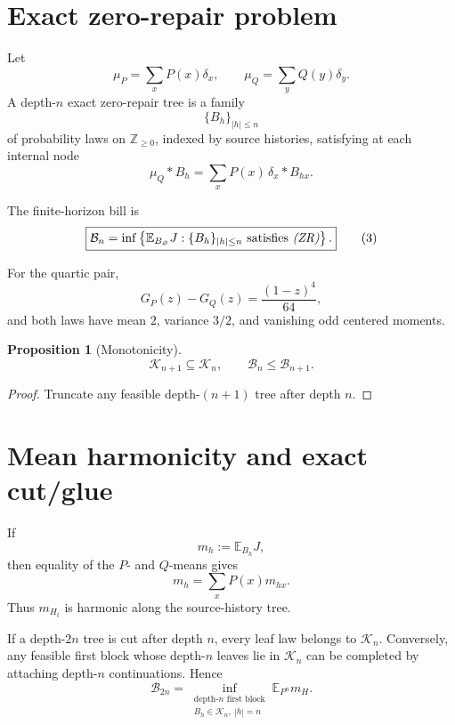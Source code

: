 \documentclass[11pt,a4paper]{article}
\newcommand{\Bcal}{\mathcal B}
\newcommand{\Kcal}{\mathcal K}
\newcommand{\E}{\mathbb E}
\newcommand{\Z}{\mathbb Z}
\newtheorem{proposition}[theorem]{Proposition}
\begin{document}
\section{Exact zero-repair problem}

Let
\[
\mu_P=\sum_xP(x)\delta_x,
\qquad
\mu_Q=\sum_yQ(y)\delta_y.
\]
A depth-\(n\) exact zero-repair tree is a family
\[
\{B_h\}_{|h|\le n}
\]
of probability laws on \(\Z_{\ge0}\), indexed by source histories, satisfying
at each internal node
\begin{equation}
\boxed{
\mu_Q*B_h
=
\sum_xP(x)\,\delta_x*B_{hx}.
}
\tag{ZR}
\end{equation}

The finite-horizon bill is
\[
\boxed{
\Bcal_n
=
\inf\left\{
\E_{B_\varnothing}J:
\{B_h\}_{|h|\le n}\text{ satisfies \emph{(ZR)}}
\right\}.
}
\tag{3}
\]

For the quartic pair,
\[
G_P(z)-G_Q(z)
=
\boxed{\frac{(1-z)^4}{64}},
\tag{4}
\]
and both laws have mean \(2\), variance \(3/2\), and vanishing odd centered
moments.

\begin{proposition}[Monotonicity]
\[
\boxed{
\Kcal_{n+1}\subseteq\Kcal_n,
\qquad
\Bcal_n\le\Bcal_{n+1}.
}
\tag{5}
\]
\end{proposition}

\begin{proof}
Truncate any feasible depth-\((n+1)\) tree after depth \(n\).
\end{proof}

\section{Mean harmonicity and exact cut/glue}

If
\[
m_h:=\E_{B_h}J,
\]
then equality of the \(P\)- and \(Q\)-means gives
\[
\boxed{
m_h
=
\sum_xP(x)m_{hx}.
}
\tag{6}
\]
Thus \(m_{H_t}\) is harmonic along the source-history tree.

If a depth-\(2n\) tree is cut after depth \(n\), every leaf law belongs to
\(\Kcal_n\).
Conversely, any feasible first block whose depth-\(n\) leaves lie in
\(\Kcal_n\) can be completed by attaching depth-\(n\) continuations.
Hence
\[
\boxed{
\Bcal_{2n}
=
\inf_{\substack{\text{depth-}n\text{ first block}\\ B_h\in\Kcal_n,\ |h|=n}}
\E_{P^n}m_H.
}
\tag{7}
\]
\end{document}
